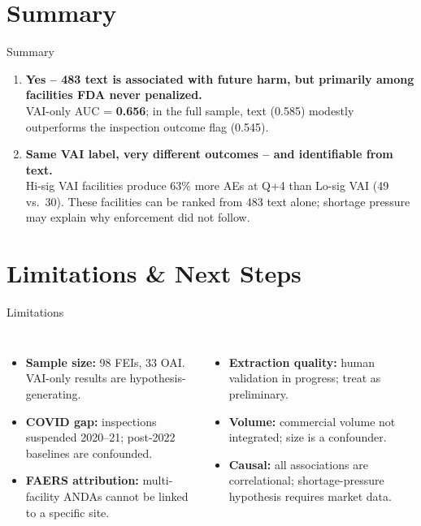 \documentclass[aspectratio=169,10pt]{beamer}
\newcommand{\highlight}[1]{{\color{ncsuRed}\textbf{#1}}}
\begin{document}
\section{Summary}

\begin{frame}{Summary}

\begin{enumerate}
  \setlength{\itemsep}{8pt}
  \item \textbf{Yes -- 483 text is associated with future harm, but primarily among facilities FDA never penalized.}\\
    VAI-only AUC = \highlight{0.656}; in the full sample, text (0.585) modestly outperforms the inspection outcome flag (0.545).
  \pause

  \item \textbf{Same VAI label, very different outcomes -- and identifiable from text.}\\
    Hi-sig VAI facilities produce 63\% more AEs at Q+4 than Lo-sig VAI (49 vs.\ 30). These facilities can be ranked from 483 text alone; shortage pressure may explain why enforcement did not follow.
\end{enumerate}

\end{frame}

\section{Limitations \& Next Steps}

\begin{frame}{Limitations}
\begin{columns}[T]
\begin{itemize}
  \setlength{\itemsep}{6pt}
  \item \textbf{Sample size:} 98 FEIs, 33 OAI. VAI-only results are hypothesis-generating.
  \item \textbf{COVID gap:} inspections suspended 2020--21; post-2022 baselines are confounded.
  \item \textbf{FAERS attribution:} multi-facility ANDAs cannot be linked to a specific site.
\end{itemize}

\pause
{}
\begin{itemize}
  \setlength{\itemsep}{6pt}
  \item \textbf{Extraction quality:} human validation in progress; treat as preliminary.
  \item \textbf{Volume:} commercial volume not integrated; size is a confounder.
  \item \textbf{Causal:} all associations are correlational; shortage-pressure hypothesis requires market data.
\end{itemize}
\end{columns}
\end{frame}
\end{document}
